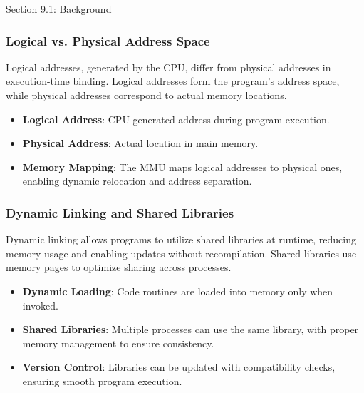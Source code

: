 \begin{notes}{Section 9.1: Background}
\begin{highlight}
    \end{highlight}
    
    \subsubsection*{Logical vs. Physical Address Space}
    
    Logical addresses, generated by the CPU, differ from physical addresses in execution-time binding. Logical addresses form the program’s address space, while physical addresses correspond to actual 
    memory locations.
    
    \begin{highlight}
    
        \begin{itemize}
            \item \textbf{Logical Address}: CPU-generated address during program execution.
            \item \textbf{Physical Address}: Actual location in main memory.
            \item \textbf{Memory Mapping}: The MMU maps logical addresses to physical ones, enabling dynamic relocation and address separation.
        \end{itemize}
    
    \end{highlight}
    
    \subsubsection*{Dynamic Linking and Shared Libraries}
    
    Dynamic linking allows programs to utilize shared libraries at runtime, reducing memory usage and enabling updates without recompilation. Shared libraries use memory pages to optimize sharing 
    across processes.
    
    \begin{highlight}
    
        \begin{itemize}
            \item \textbf{Dynamic Loading}: Code routines are loaded into memory only when invoked.
            \item \textbf{Shared Libraries}: Multiple processes can use the same library, with proper memory management to ensure consistency.
            \item \textbf{Version Control}: Libraries can be updated with compatibility checks, ensuring smooth program execution.
        \end{itemize}
    

\end{highlight}
\end{notes}
